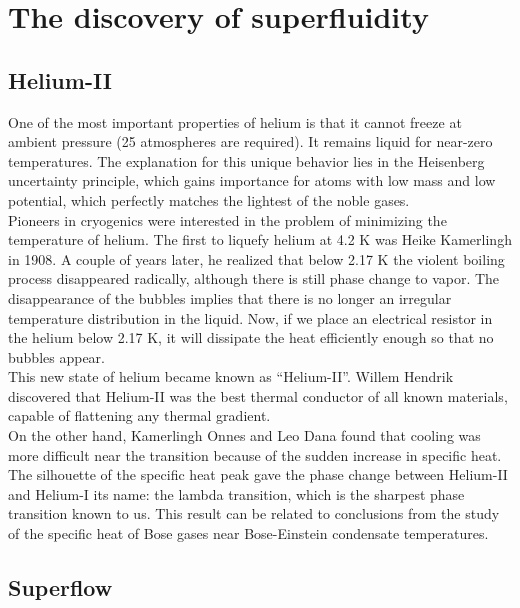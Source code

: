 \documentclass{article}
\begin{document}
\section{The discovery of superfluidity}

\subsection{Helium-II}
One of the most important properties of helium is that it cannot freeze at ambient pressure (25 atmospheres are required). It remains liquid for near-zero temperatures. The explanation for this unique behavior lies in the Heisenberg uncertainty principle, which gains importance for atoms with low mass and low potential, which perfectly matches the lightest of the noble gases.
\\

Pioneers in cryogenics were interested in the problem of minimizing the temperature of helium. The first to liquefy helium at 4.2 K was Heike Kamerlingh in 1908. A couple of years later, he realized that below 2.17 K the violent boiling process disappeared radically, although there is still phase change to vapor. The disappearance of the bubbles implies that there is no longer an irregular temperature distribution in the liquid. Now, if we place an electrical resistor in the helium below 2.17 K, it will dissipate the heat efficiently enough so that no bubbles appear. 
\\

This new state of helium became known as “Helium-II”. Willem Hendrik discovered that Helium-II was the best thermal conductor of all known materials, capable of flattening any thermal gradient. 
\\

On the other hand, Kamerlingh Onnes and Leo Dana found that cooling was more difficult near the transition because of the sudden increase in specific heat. The silhouette of the specific heat peak gave the phase change between Helium-II and Helium-I its name: the lambda transition, which is the sharpest phase transition known to us. This result can be related to conclusions from the study of the specific heat of Bose gases near Bose-Einstein condensate temperatures.
\\

\subsection{Superflow}
\end{document}
